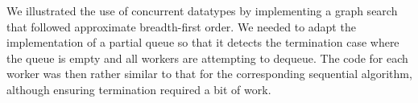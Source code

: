 We illustrated the use of concurrent datatypes by implementing a graph search
that followed approximate breadth-first order.  We needed to adapt the
implementation of a partial queue so that it detects the termination case
where the queue is empty and all workers are attempting to dequeue.  The code
for each worker was then rather similar to that for the corresponding
sequential algorithm, although ensuring termination required a bit of work.



\exercises






